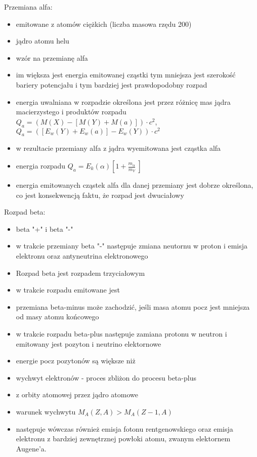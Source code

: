 \documentclass{article}
\begin{document}
Przemiana alfa:
\begin{itemize}
    \item emitowane z atomów ciężkich (liczba masowa rzędu 200)
    \item jądro atomu helu
    \item wzór na przemianę alfa
    \item im większa jest energia emitowanej cząstki tym mniejsza jest szerokość bariery potencjału i tym bardziej jest prawdopodobny rozpad
    \item energia uwalniana w rozpadzie określona jest przez różnicę mas jądra macierzystego i produktów rozpadu $Q_a = (M(X)-[M(Y)+M(a)])\cdot c^2$, $Q_a = ([E_w(Y)+E_w(a)] - E_w(Y))\cdot c^2$
    \item w rezultacie przemiany alfa z jądra wyemitowana jest cząstka alfa
    \item energia rozpadu $Q_a = E_k(\alpha)\left[ 1 + \frac{m_{\alpha}}{m_{Y}}\ \right]$
    \item energia emitowanych cząstek alfa dla danej przemiany jest dobrze określona, co jest konsekwencją faktu, że rozpad jest dwuciałowy
\end{itemize}

Rozpad beta:
\begin{itemize}
    \item beta "+" i beta "-"
    \item w trakcie przemiany beta "-" następuje zmiana neutornu w proton i emisja elektronu oraz antyneutrina elektronowego
    \item Rozpad beta jest rozpadem trzyciałowym
    \item w trakcie rozpadu emitowane jest 
    \item przemiana beta-minus może zachodzić, jeśli masa atomu pocz jest mniejsza od masy atomu końcowego
    \item w trakcie rozpadu beta-plus następuje zamiana protonu w neutron i emitowany jest pozyton i neutrino elektornowe
    \item energie pocz pozytonów są większe niż
    \item wychwyt elektronów - proces zbliżon do procesu beta-plus
    \item z orbity atomowej przez jądro atomowe 
    \item warunek wychwytu $M_A(Z,A) > M_A (Z-1, A)$
    \item następuje wówczas również emisja fotonu rentgenowskiego oraz emisja elektronu z bardziej zewnętrznej powłoki atomu, zwanym elektornem Augene'a.
\end{itemize}
\end{document}
